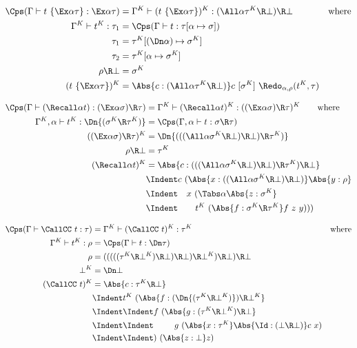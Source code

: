 \documentclass{amsart}
\begin{document}
\begin{align*}
\Cps(\Gamma \vdash t~\{\Ex\alpha\tau\} : \Ex\alpha\tau) & =
  \Gamma^K \vdash (t~\{\Ex\alpha\tau\})^K :
  (\All\alpha \tau^K \R \bot) \R \bot
  & \mbox{where}
  \\
\Gamma^K \vdash t^K : \tau_1 & =
  \Cps(\Gamma \vdash t : \tau[\alpha \mapsto \sigma])
  \\
\tau_1 & = \tau^K[(\Dn\alpha)\mapsto\sigma^K]
  \\
\tau_2 & = \tau^K[\alpha\mapsto\sigma^K]
  \\
\rho \R \bot & = \sigma^K
  \\
 (t~\{\Ex\alpha\tau\})^K & =
  \Abs{c : (\All\alpha \tau^K \R \bot)}
  c~[\sigma^K]~\Redo_{\alpha,\rho}(t^K,\tau)
\end{align*}

\begin{align*}
\Cps(\Gamma \vdash (\Recall\alpha t) :
    (\Ex\alpha\sigma) \R \tau) & =
  \Gamma^K \vdash (\Recall\alpha t)^K :
      ((\Ex\alpha\sigma) \R \tau)^K
  \qquad \mbox{where}
  \\
\Gamma^K,\alpha \vdash t^K : \Dn{(\sigma^K\R\tau^K)} & =
  \Cps(\Gamma,\alpha \vdash t : \sigma \R \tau)
  \\
((\Ex\alpha\sigma) \R \tau)^K & =
  \Dn{( ((\All\alpha \sigma^K \R \bot)\R\bot) \R \tau^K)}
  \\
\rho \R \bot & = \tau^K
  \\
(\Recall\alpha t)^K & =
  \Abs{c:(((\All\alpha \sigma^K\R\bot)\R\bot)\R\tau^K)\R\bot} \\
  &\Indent c~(\Abs{x : ((\All\alpha \sigma^K\R\bot)\R\bot)}
    \Abs{y : \rho} \\
  &\Indent\hspace{1em}
    x~(\Tabs\alpha \Abs{z : \sigma^K} \\
  &\Indent\hspace{2em}
    t^K~(\Abs{f : \sigma^K \R \tau^K}
      f~z~y
  )))
\end{align*}

\begin{align*}
\Cps(\Gamma \vdash \CallCC~t : \tau) & =
  \Gamma^K \vdash (\CallCC~t)^K : \tau^K
  &\mbox{where}
  \\
\Gamma^K \vdash t^K : \rho & =
  \Cps(\Gamma \vdash t : \Dn\tau)
  \\
\rho & =
  (((((\tau^K \R \bot^K) \R\bot)\R\bot)
    \R \bot^K) \R\bot)\R\bot
  \\
\bot^K & = \Dn\bot
  \\
(\CallCC~t)^K & =
  \Abs{c : \tau^K \R \bot}
  \\ &\Indent
  t^K~(\Abs{f : (\Dn{(\tau^K\R\bot^K)}) \R \bot^K}
  \\ &\Indent\Indent
  f~(
  \Abs{g : (\tau^K \R \bot^K) \R \bot}
  \\ &\Indent\Indent\hspace{2.5em}
  g~(\Abs{x:\tau^K} \Abs{\Id : (\bot \R \bot)} c~x)
  \\ &\Indent\Indent
  )~(\Abs{z:\bot} z)
\end{align*}
\end{document}
